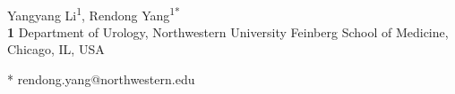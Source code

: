 \documentclass[10pt,letterpaper]{article}
\begin{document}
\vspace*{0.2in}

\begin{flushleft}
	{\Large
		\textbf{} %
	}
	\newline
	\\
	Yangyang Li\textsuperscript{1},
	Rendong Yang\textsuperscript{1*}
	\\
	\bigskip
	\textbf{1} Department of Urology, Northwestern University Feinberg School of Medicine, Chicago, IL, USA
	\bigskip






	* rendong.yang@northwestern.edu

\end{flushleft}
\end{document}
